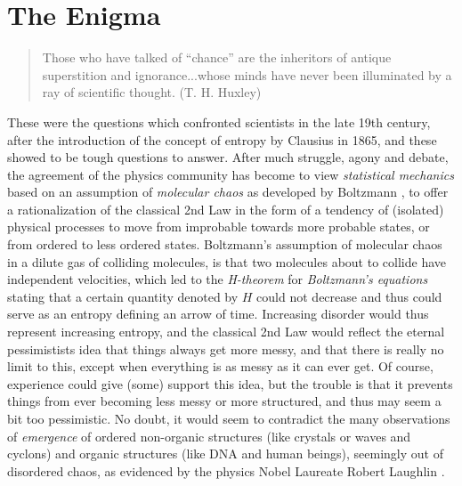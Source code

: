 
\section{The Enigma}
\small
\begin{quote}
Those who have talked of ``chance'' are the
inheritors of antique superstition and ignorance...whose minds have never
been illuminated by a ray of scientific thought. (T. H. Huxley)
\end{quote}
\normalsize

These were the questions which confronted scientists in the late 19th
century, after the introduction of the concept of entropy by Clausius
in 1865, and these showed to be tough questions to answer.  After much
struggle, agony and debate, the agreement of the physics community has
become to view \emph{statistical mechanics} based on an assumption of
\emph{molecular chaos} as developed by Boltzmann \cite{boltzmann}, to
offer a rationalization of the classical 2nd Law in the form of a
tendency of (isolated) physical processes to move from improbable
towards more probable states, or from ordered to less ordered states.
Boltzmann's assumption of molecular chaos in a dilute gas of colliding
molecules, is that two molecules about to collide have independent
velocities, which led to the \emph{H-theorem} for \emph{Boltzmann's
equations} stating that a certain quantity denoted by $H$ could not
decrease and thus could serve as an entropy defining an arrow of time.
Increasing disorder would thus represent increasing entropy, and the
classical 2nd Law would reflect the eternal pessimistists idea that
things always get more messy, and that there is really no limit to
this, except when everything is as messy as it can ever get. Of
course, experience could give (some) support this idea, but the
trouble is that it prevents things from ever becoming less messy or
more structured, and thus may seem a bit too pessimistic.  No doubt,
it would seem to contradict the many observations of \emph{emergence}
of ordered non-organic structures (like crystals or waves and cyclons)
and organic structures (like DNA and human beings), seemingly out of
disordered chaos, as evidenced by the physics Nobel Laureate Robert
Laughlin \cite{laughlin}.


